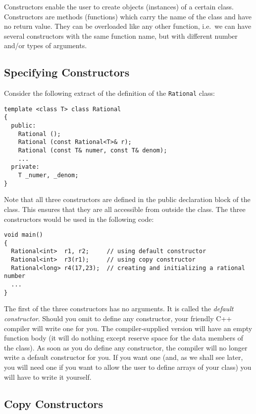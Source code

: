 Constructors enable the user to create objects (instances) of a certain class. Constructors 
are methods (functions) which carry the name of the class and have no return value.
They can be overloaded like any other function, i.e.\  we can have several constructors
with the same function name, but with different number and/or types of arguments.


\subsection{Specifying Constructors}

Consider the following extract of the definition of the \verb+Rational+ class:
{\footnotesize \begin{verbatim}
template <class T> class Rational
{
  public:
    Rational ();
    Rational (const Rational<T>& r);
    Rational (const T& numer, const T& denom);
    ...
  private:
    T _numer, _denom;
}
\end{verbatim}}
Note that all three constructors are defined in the public declaration block
of the class. This ensures that they are all accessible from outside the class.
The three constructors would be used in the following code:
{\footnotesize \begin{verbatim}
void main()
{
  Rational<int>  r1, r2;     // using default constructor
  Rational<int>  r3(r1);     // using copy constructor
  Rational<long> r4(17,23);  // creating and initializing a rational number
  ...
}
\end{verbatim}}

The first of the three constructors has no arguments. It is called the 
{\em default constructor}.
Should you omit to define any constructor, your friendly C++ compiler will write
one for you. The compiler-supplied version will have an empty function body
(it will do nothing except reserve space for the data members of the class).
As soon as you do define any constructor, the compiler will no longer write a
default constructor for you. If you want one (and, as we shall see later,  you 
will need one if you want to allow the user to define arrays of your class) 
you will have to write it yourself. 


\subsection{Copy Constructors}

